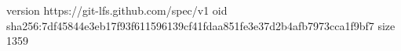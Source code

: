 version https://git-lfs.github.com/spec/v1
oid sha256:7df45844e3eb17f93f611596139cf41fdaa851fe3e37d2b4afb7973cca1f9bf7
size 1359
